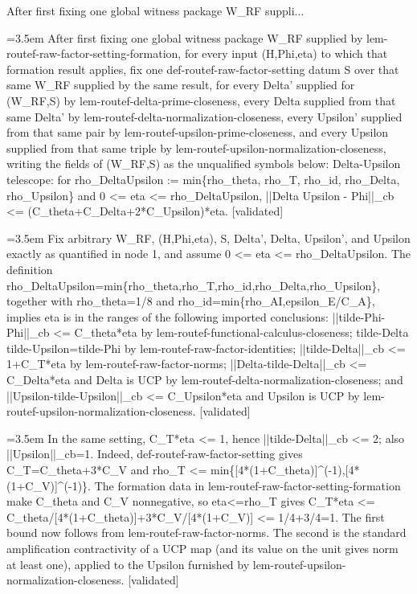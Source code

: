 \documentclass{article}
\newcommand{\step}[1]{\par\noindent\hangindent=3.5em\hangafter=1%
  \makebox[3.5em][l]{\textbf{#1.}}}
\newcommand{\steptag}[1]{\hfill{\small\textsf{[#1]}}}
\begin{document}
\begin{proofbox}{After first fixing one global witness package W\_RF suppli...}
\step{1} After first fixing one global witness package W\_RF supplied by lem-routef-raw-factor-setting-formation, for every input (H,Phi,eta) to which that formation result applies, fix one def-routef-raw-factor-setting datum S over that same W\_RF supplied by the same result, for every Delta' supplied for (W\_RF,S) by lem-routef-delta-prime-closeness, every Delta supplied from that same Delta' by lem-routef-delta-normalization-closeness, every Upsilon' supplied from that same pair by lem-routef-upsilon-prime-closeness, and every Upsilon supplied from that same triple by lem-routef-upsilon-normalization-closeness, writing the fields of (W\_RF,S) as the unqualified symbols below: Delta-Upsilon telescope: for rho\_DeltaUpsilon := min\{rho\_theta, rho\_T, rho\_id, rho\_Delta, rho\_Upsilon\} and 0 <= eta <= rho\_DeltaUpsilon, ||Delta Upsilon - Phi||\_cb <= (C\_theta+C\_Delta+2*C\_Upsilon)*eta. \steptag{validated} \\[6pt]
\step{1.1} Fix arbitrary W\_RF, (H,Phi,eta), S, Delta', Delta, Upsilon', and Upsilon exactly as quantified in node 1, and assume 0 <= eta <= rho\_DeltaUpsilon.  The definition rho\_DeltaUpsilon=min\{rho\_theta,rho\_T,rho\_id,rho\_Delta,rho\_Upsilon\}, together with rho\_theta=1/8 and rho\_id=min\{rho\_AI,epsilon\_E/C\_A\}, implies eta is in the ranges of the following imported conclusions: ||tilde-Phi-Phi||\_cb <= C\_theta*eta by lem-routef-functional-calculus-closeness; tilde-Delta tilde-Upsilon=tilde-Phi by lem-routef-raw-factor-identities; ||tilde-Delta||\_cb <= 1+C\_T*eta by lem-routef-raw-factor-norms; ||Delta-tilde-Delta||\_cb <= C\_Delta*eta and Delta is UCP by lem-routef-delta-normalization-closeness; and ||Upsilon-tilde-Upsilon||\_cb <= C\_Upsilon*eta and Upsilon is UCP by lem-routef-upsilon-normalization-closeness. \steptag{validated} \\[4pt]
\step{1.2} In the same setting, C\_T*eta <= 1, hence ||tilde-Delta||\_cb <= 2; also ||Upsilon||\_cb=1.  Indeed, def-routef-raw-factor-setting gives C\_T=C\_theta+3*C\_V and rho\_T <= min\{[4*(1+C\_theta)]\textasciicircum{}(-1),[4*(1+C\_V)]\textasciicircum{}(-1)\}.  The formation data in lem-routef-raw-factor-setting-formation make C\_theta and C\_V nonnegative, so eta<=rho\_T gives C\_T*eta <= C\_theta/[4*(1+C\_theta)]+3*C\_V/[4*(1+C\_V)] <= 1/4+3/4=1.  The first bound now follows from lem-routef-raw-factor-norms.  The second is the standard amplification contractivity of a UCP map (and its value on the unit gives norm at least one), applied to the Upsilon furnished by lem-routef-upsilon-normalization-closeness. \steptag{validated} \\[4pt]

\end{proofbox}
\end{document}
